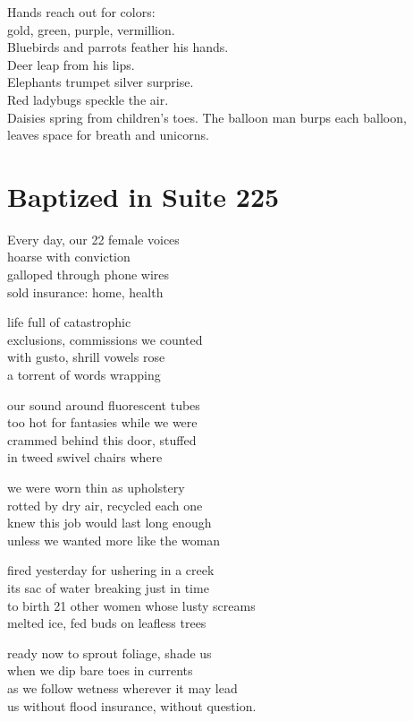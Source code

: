 \documentclass[twoside,10pt]{book}
\begin{document}
Hands reach out for colors:\\
gold, green, purple, vermillion.\\
Bluebirds and parrots feather his hands.\\
Deer leap from his lips.\\
Elephants trumpet silver surprise.\\
Red ladybugs speckle the air.\\
Daisies spring from children's toes.
\clearpage
The balloon man burps each balloon,\\
leaves space for breath and unicorns.

\clearpage
\section{Baptized in Suite 225}

Every day, our 22 female voices\\
hoarse with conviction\\
galloped through phone wires\\
sold insurance: home, health

life full of catastrophic\\
exclusions, commissions we counted\\
with gusto, shrill vowels rose\\
a torrent of words wrapping

our sound around fluorescent tubes\\
too hot for fantasies while we were\\
crammed behind this door, stuffed\\
in tweed swivel chairs where

we were worn thin as upholstery\\
rotted by dry air, recycled each one\\
knew this job would last long enough\\
unless we wanted more like the woman

fired yesterday for ushering in a creek\\
its sac of water breaking just in time\\
to birth 21 other women whose lusty screams\\
melted ice, fed buds on leafless trees

ready now to sprout foliage, shade us\\
when we dip bare toes in currents\\
as we follow wetness wherever it may lead\\
us without flood insurance, without question.
\end{document}

